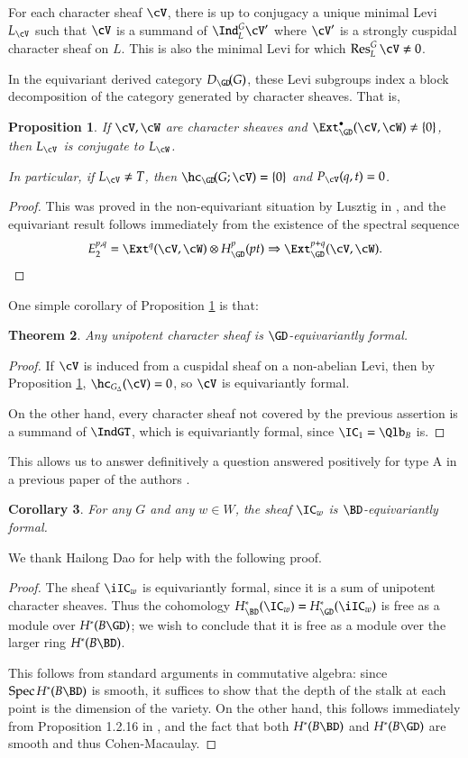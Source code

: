 \documentclass[12pt]{amsart}
\DeclareMathOperator{\Spec}{Spec}
\DeclareMathOperator{\Res}{Res}
\newtheorem{thm}{Theorem}%
\newtheorem{prop}[thm]{Proposition}
\newtheorem{cor}[thm]{Corollary}
\theoremstyle{remark}
\begin{document}
For each character sheaf $\cV$, there is up to conjugacy a unique minimal Levi $L_\cV$ such that $\cV$ is a summand of $\Ind^G_L\cV'$ where $\cV'$ is a strongly cuspidal character sheaf on $L$.  This is also the minimal Levi for which $\Res^G_L\cV\neq 0$.

In the equivariant derived category $D_{\GD}\!(G)$, these Levi subgroups index a block decomposition of the category generated by character sheaves.   That is,
\begin{prop}\label{block}
  If $\cV,\cW$ are character sheaves and
  $\Ext_{\GD}^\bullet(\cV,\cW)\neq \{0\}$, then $L_\cV$ is conjugate to $L_\cW$.   

In particular, if $L_\cV\neq T$, then $\hc_{\GD}\!(G;\cV)=\{0\}$ and $P_\cV(q,t)=0$.
\end{prop}
\begin{proof}
  This was proved in the non-equivariant situation by Lusztig in
  \cite[7.2]{LusCSII}, and the equivariant result follows immediately from the existence of the spectral sequence
  \[
  E_2^{p,q} = \Ext^q(\cV,\cW) \otimes H_{\GD}^{p}(pt) \Rightarrow \Ext_{\GD}^{p+q}(\cV,\cW). \qedhere
  \] \end{proof}

One simple corollary of Proposition \ref{block} is that:

\begin{thm}\label{formal}
  Any unipotent character sheaf is $\GD$-equivariantly formal.
\end{thm}
\begin{proof}
If $\cV$ is induced from a cuspidal sheaf on a non-abelian Levi, then by Proposition \ref{block}, $\hc_{G_\Delta}(\cV)=0$, so $\cV$ is equivariantly formal.

On the other hand, every character sheaf not covered by the
previous assertion is a summand of $\IndGT$, which is equivariantly formal, since $\IC_{1}=\Qlb_B$ is.
\end{proof}

This allows us to answer definitively a question answered positively for type A in a previous paper of the authors \cite{WW}.

\begin{cor}
  For any $G$ and any $w\in W$, the sheaf $\IC_w$ is
  $\BD$-equivariantly formal.
\end{cor}
We thank Hailong Dao for help with the following proof. 
\begin{proof}
The sheaf $\iIC_w$ is equivariantly formal, since it is a sum of unipotent character sheaves.  
Thus the cohomology $H^*_{\BD}(\IC_w)=H^*_{\GD}(\iIC_w)$ is free as a module over $H^*(B\GD)$; we wish to conclude that it is free as a module over the larger ring $H^*(B\BD)$. 

This follows from standard arguments in commutative algebra: since $\Spec H^*(B\BD)$ is smooth, it suffices to show that the depth of the stalk at each point is the dimension of the variety.  On the other hand, this follows immediately from Proposition 1.2.16 in \cite{BH}, and the fact that both $H^*(B\BD)$ and $H^*(B\GD)$ are smooth and thus Cohen-Macaulay.
\end{proof}
\end{document}
